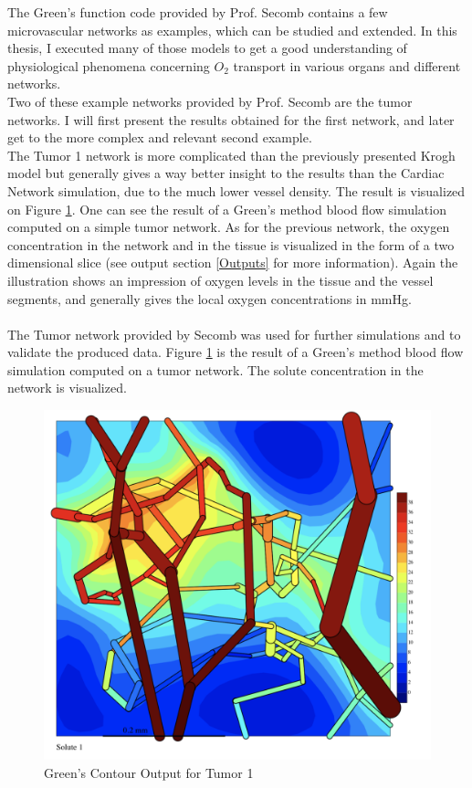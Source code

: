 The Green's function code provided by Prof. Secomb contains a few microvascular networks as examples, which can be studied and extended. In this thesis, I executed many of those models to get a good understanding of physiological phenomena concerning $O_2$ transport in various organs and different networks.
\\Two of these example networks provided by Prof. Secomb are the tumor networks. I will first present the results obtained for the first network, and later get to the more complex and relevant second example.
\\The Tumor 1 network is more complicated than the previously presented Krogh model but generally gives a way better insight to the results than the Cardiac Network simulation, due to the much lower vessel density. The result is visualized on Figure \ref{fig:Contour_Tumor1998}. One can see the result of a Green's method blood flow simulation computed on a simple tumor network. As for the previous network, the oxygen concentration in the network and in the tissue is visualized in the form of a two dimensional slice (see output section \ref{Outputs} for more information). Again the illustration shows an impression of oxygen levels in the tissue and the vessel segments, and generally gives the local oxygen concentrations in mmHg.\\\\
The Tumor network provided by Secomb was used for further simulations and to validate the produced data.
Figure \ref{fig:Contour_Tumor1998}  is the result of a Green's method blood flow simulation computed on a tumor network. The solute concentration in the network is visualized.\\
\begin{figure}[h]
\centering
\includegraphics[width=120mm]{Contour_Tumor1998}
\caption{\footnotesize Green's Contour Output for Tumor 1}
\label{fig:Contour_Tumor1998}
\end{figure}\\
